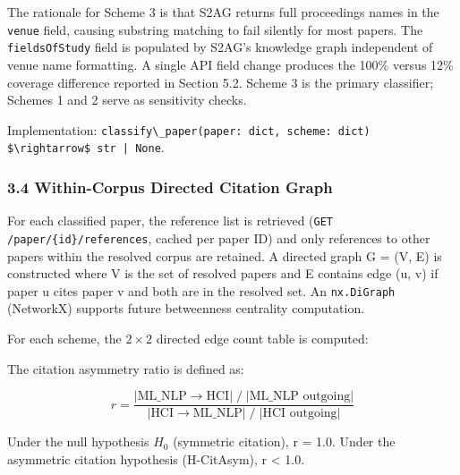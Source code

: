 The rationale for Scheme 3 is that S2AG returns full proceedings names in the \texttt{venue} field, causing substring matching to fail silently for most papers. The \texttt{fieldsOfStudy} field is populated by S2AG's knowledge graph independent of venue name formatting. A single API field change produces the 100\% versus 12\% coverage difference reported in Section 5.2. Scheme 3 is the primary classifier; Schemes 1 and 2 serve as sensitivity checks.

Implementation: \texttt{classify\textbackslash \_paper(paper: dict, scheme: dict) \$\textbackslash rightarrow\$ str | None}.

\subsubsection{3.4 Within-Corpus Directed Citation Graph}

For each classified paper, the reference list is retrieved (\texttt{GET /paper/\{id\}/references}, cached per paper ID) and only references to other papers within the resolved corpus are retained. A directed graph G = (V, E) is constructed where V is the set of resolved papers and E contains edge (u, v) if paper u cites paper v and both are in the resolved set. An \texttt{nx.DiGraph} (NetworkX) supports future betweenness centrality computation.

For each scheme, the $2\times 2$ directed edge count table is computed:

\begin{table}[htbp]
\centering
{}
\end{table}

The citation asymmetry ratio is defined as:

$$r = \frac{|\text{ML\_NLP} \to \text{HCI}| \;/\; |\text{ML\_NLP outgoing}|}{|\text{HCI} \to \text{ML\_NLP}| \;/\; |\text{HCI outgoing}|}$$

Under the null hypothesis $H_0$ (symmetric citation), r = 1.0. Under the asymmetric citation hypothesis (H-CitAsym), r < 1.0.

